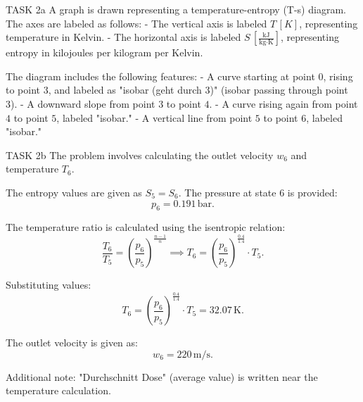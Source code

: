 TASK 2a  
A graph is drawn representing a temperature-entropy (T-s) diagram. The axes are labeled as follows:  
- The vertical axis is labeled \( T \, [K] \), representing temperature in Kelvin.  
- The horizontal axis is labeled \( S \, \left[\frac{\text{kJ}}{\text{kg·K}}\right] \), representing entropy in kilojoules per kilogram per Kelvin.  

The diagram includes the following features:  
- A curve starting at point \( 0 \), rising to point \( 3 \), and labeled as "isobar (geht durch 3)" (isobar passing through point 3).  
- A downward slope from point \( 3 \) to point \( 4 \).  
- A curve rising again from point \( 4 \) to point \( 5 \), labeled "isobar."  
- A vertical line from point \( 5 \) to point \( 6 \), labeled "isobar."  

TASK 2b  
The problem involves calculating the outlet velocity \( w_6 \) and temperature \( T_6 \).  

The entropy values are given as \( S_5 = S_6 \). The pressure at state 6 is provided:  
\[
p_6 = 0.191 \, \text{bar}.
\]  

The temperature ratio is calculated using the isentropic relation:  
\[
\frac{T_6}{T_5} = \left(\frac{p_6}{p_5}\right)^{\frac{n-1}{n}} \implies T_6 = \left(\frac{p_6}{p_5}\right)^{\frac{0.4}{1.4}} \cdot T_5.
\]  

Substituting values:  
\[
T_6 = \left(\frac{p_6}{p_5}\right)^{\frac{0.4}{1.4}} \cdot T_5 = 32.07 \, \text{K}.
\]  

The outlet velocity is given as:  
\[
w_6 = 220 \, \text{m/s}.
\]  

Additional note: "Durchschnitt Dose" (average value) is written near the temperature calculation.